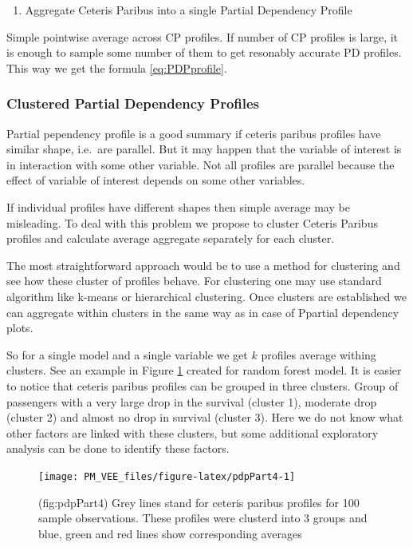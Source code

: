 \documentclass[12pt,]{krantz}
\providecommand{\tightlist}{%
  \setlength{\itemsep}{0pt}\setlength{\parskip}{0pt}}
\begin{document}
\begin{enumerate}
\def\labelenumi{\arabic{enumi}.}
\setcounter{enumi}{1}
\tightlist
\item
  Aggregate Ceteris Paribus into a single Partial Dependency Profile
\end{enumerate}

Simple pointwise average across CP profiles. If number of CP profiles is large, it is enough to sample some number of them to get resonably accurate PD profiles.
This way we get the formula \eqref{eq:PDPprofile}.

\hypertarget{clustered-partial-dependency-profiles}{%
\subsubsection{Clustered Partial Dependency Profiles}\label{clustered-partial-dependency-profiles}}

Partial pependency profile is a good summary if ceteris paribus profiles have similar shape, i.e.~are parallel. But it may happen that the variable of interest is in interaction with some other variable. Not all profiles are parallel because the effect of variable of interest depends on some other variables.

If individual profiles have different shapes then simple average may be misleading.
To deal with this problem we propose to cluster Ceteris Paribus profiles and calculate average aggregate separately for each cluster.

The most straightforward approach would be to use a method for clustering and see how these cluster of profiles behave.
For clustering one may use standard algorithm like k-means or hierarchical clustering. Once clusters are established we can aggregate within clusters in the same way as in case of Ppartial dependency plots.

So for a single model and a single variable we get \(k\) profiles average withing clusters.
See an example in Figure \ref{fig:pdpPart4} created for random forest model. It is easier to notice that ceteris paribus profiles can be grouped in three clusters. Group of passengers with a very large drop in the survival (cluster 1), moderate drop (cluster 2) and almost no drop in survival (cluster 3). Here we do not know what other factors are linked with these clusters, but some additional exploratory analysis can be done to identify these factors.

\begin{figure}

{\centering \texttt{[image: PM\_VEE\_files/figure-latex/pdpPart4-1]} 

}

\caption{(fig:pdpPart4) Grey lines stand for ceteris paribus profiles for 100 sample observations. These profiles were clusterd into 3 groups and blue, green and red lines show corresponding averages}\label{fig:pdpPart4}
\end{figure}
\end{document}
